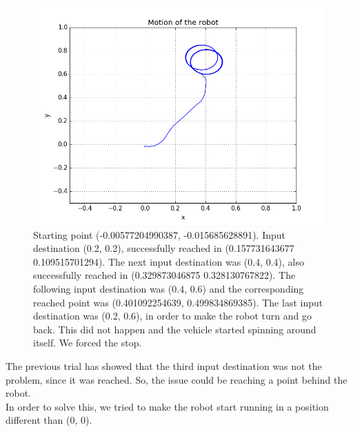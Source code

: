 \documentclass[a4paper,11pt,oneside]{book}
\begin{document}
\begin{figure}[H]
\begin{center}
\includegraphics[width=1\textwidth]{figs/experiments/5}
\caption[Experiment: Destination (0.2, 0.2), (0.4, 0.4), (0.4, 0.6), (0.2, 0.6)]{Starting point (-0.00577204990387, -0.015685628891). Input destination (0.2, 0.2), successfully reached in (0.157731643677 0.109515701294). The next input destination was (0.4, 0.4), also successfully reached in (0.329873046875 0.328130767822). The following input destination was (0.4, 0.6) and the corresponding reached point was (0.401092254639, 0.499834869385). The last input destination was (0.2, 0.6), in order to make the robot turn and go back. This did not happen and the vehicle started spinning around itself. We forced the stop.}
\end{center}
\end{figure}

The previous trial has showed that the third input destination was not the problem, since it was reached. So, the issue could be reaching a point behind the robot.
\\ In order to solve this, we tried to make the robot start running in a position different than (0, 0).
\end{document}
